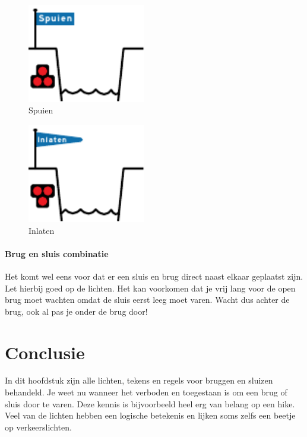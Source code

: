   \begin{center}
	\begin{minipage}[b]{0.40\textwidth}
		\begin{figure}[H]
			\centering
			\includegraphics[width=0.46\textwidth]{Hoofdstukken/Bruggen/pdf/sluis_spuien.pdf}
			\caption{Spuien}
			\label{pic:sluis:spuien}
		\end{figure}
	\end{minipage}
	\hspace{1cm}
	\begin{minipage}[b]{0.40\textwidth}
		\begin{figure}[H]
			\centering
			\includegraphics[width=0.46\textwidth]{Hoofdstukken/Bruggen/pdf/sluis_inlaten.pdf}
			\caption{Inlaten}
			\label{pic:sluis:inlaten}
		\end{figure}
	\end{minipage}
\end{center}

\paragraph{Brug en sluis combinatie}
Het komt wel eens voor dat er een sluis en brug direct naast elkaar geplaatst zijn. Let hierbij goed op de lichten. Het kan voorkomen dat je vrij lang voor de open brug moet wachten omdat de sluis eerst leeg moet varen. Wacht dus achter de brug, ook al pas je onder de brug door!

\section{Conclusie}
In dit hoofdstuk zijn alle lichten, tekens en regels voor bruggen en sluizen behandeld. Je weet nu wanneer het verboden en toegestaan is om een brug of sluis door te varen. Deze kennis is bijvoorbeeld heel erg van belang op een hike. Veel van de lichten hebben een logische betekenis en lijken soms zelfs een beetje op verkeerslichten. 
